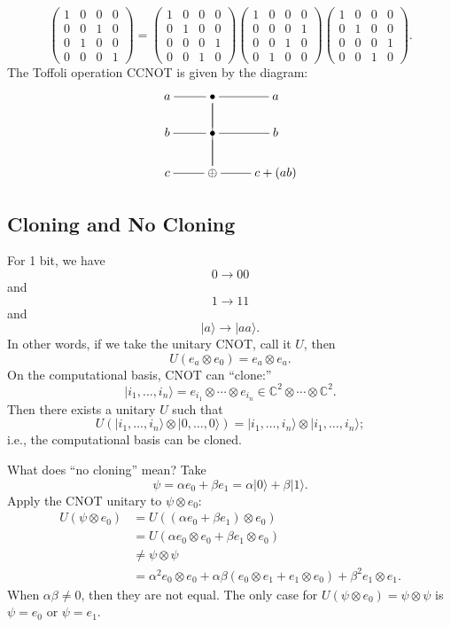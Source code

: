 \documentclass[12pt]{article}
\theoremstyle{definition}
\newcommand{\ket}[1]{|#1\rangle}
\newcommand{\C}{\mathbb{C}}
\begin{document}
\[
\begin{pmatrix}1&0&0&0\\0&0&1&0\\0&1&0&0\\0&0&0&1\end{pmatrix} =
\begin{pmatrix}1&0&0&0\\0&1&0&0\\0&0&0&1\\0&0&1&0\end{pmatrix}
\begin{pmatrix}1&0&0&0\\0&0&0&1\\0&0&1&0\\0&1&0&0\end{pmatrix}
\begin{pmatrix}1&0&0&0\\0&1&0&0\\0&0&0&1\\0&0&1&0\end{pmatrix}.
\]
The Toffoli operation CCNOT is given by the diagram:
\[
\xymatrix@C=2.4em@R=1.8em{
a \ar@{-}[r] & \bullet \ar@{-}[d] \ar@{-}[dd] \ar@{-}[r] & a \\
b \ar@{-}[r] & \bullet \ar@{-}[d] \ar@{-}[r] & b \\
c \ar@{-}[r] & \oplus \ar@{-}[r] & c+(ab)
}
\]

\subsection{Cloning and No Cloning}

For 1 bit, we have
\[
0 \to 00
\]
and
\[
1 \to 11
\]
and
\[
\ket{a} \to \ket{aa}.
\]
In other words, if we take the unitary CNOT, call it $U$, then
\[
U(e_a \otimes e_0) = e_a \otimes e_a.
\]
On the computational basis, CNOT can ``clone:''
\[
\ket{i_1,\ldots,i_n} = e_{i_1} \otimes \cdots \otimes e_{i_n} \in \C^2 \otimes \cdots \otimes \C^2.
\]
Then there exists a unitary $U$ such that
\[
U(\ket{i_1,\ldots,i_n} \otimes \ket{0,\ldots,0}) = \ket{i_1,\ldots,i_n} \otimes \ket{i_1,\ldots,i_n};
\]
i.e., the computational basis can be cloned.

What does ``no cloning'' mean? Take
\[
\psi = \alpha e_0 + \beta e_1 = \alpha\ket{0} + \beta\ket{1}.
\]
Apply the CNOT unitary to $\psi \otimes e_0$:
\begin{align*}
U(\psi \otimes e_0) &= U((\alpha e_0 + \beta e_1) \otimes e_0)\\
&= U(\alpha e_0 \otimes e_0 + \beta e_1 \otimes e_0)\\
&\neq \psi \otimes \psi\\
&= \alpha^2 e_0 \otimes e_0 + \alpha\beta(e_0 \otimes e_1 + e_1 \otimes e_0) + \beta^2 e_1 \otimes e_1.
\end{align*}
When $\alpha\beta \neq 0$, then they are not equal. The only case for $U(\psi \otimes e_0) = \psi \otimes \psi$ is $\psi = e_0$ or $\psi = e_1$.
\end{document}
